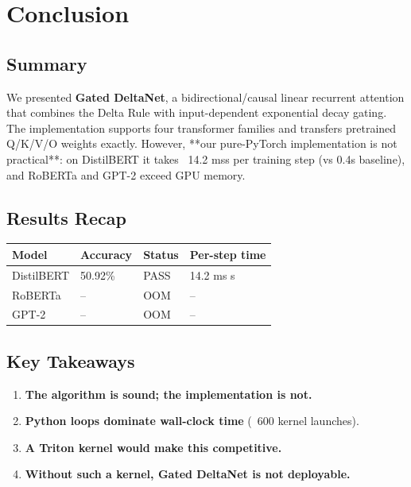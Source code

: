 
\section{Conclusion}

\subsection{Summary}

We presented \textbf{Gated DeltaNet}, a bidirectional/causal linear recurrent 
attention that combines the Delta Rule with input-dependent exponential 
decay gating. The implementation supports four transformer families and 
transfers pretrained Q/K/V/O weights exactly. However, **our pure-PyTorch 
implementation is not practical**: on DistilBERT it takes ~14.2 mss 
per training step (vs 0.4s baseline), and RoBERTa and GPT-2 exceed GPU memory.

\subsection{Results Recap}

\begin{table}[H]
\centering
\small
\begin{tabular}{llll}
\toprule
\textbf{Model} & \textbf{Accuracy} & \textbf{Status} & \textbf{Per-step time} \\
\midrule
DistilBERT & 50.92\% & PASS & 14.2 ms s \\
RoBERTa & -- & OOM & -- \\
GPT-2 & -- & OOM & -- \\
\bottomrule
\end{tabular}
\end{table}

\subsection{Key Takeaways}

\begin{enumerate}
\item \textbf{The algorithm is sound; the implementation is not.}
\item \textbf{Python loops dominate wall-clock time} (~600 kernel launches).
\item \textbf{A Triton kernel would make this competitive.}
\item \textbf{Without such a kernel, Gated DeltaNet is not deployable.}

\end{enumerate}
